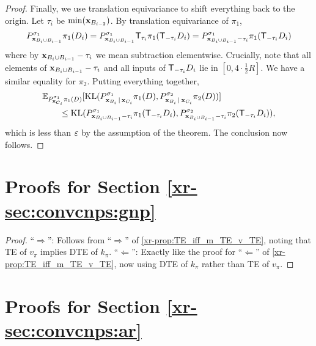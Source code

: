 \documentclass[12pt, twoside]{report}
\newcommand{\xrprefix}[1]{xr-#1}
\begin{document}
\begin{proof}
    Finally, we use translation equivariance to shift everything back to the origin.
    Let $\tau_i$ be $\operatorname*{min}(\mathbf{x}_{B_{i-2}})$.
    By translation equivariance of $\pi_1$,
    \begin{equation}
        P_{\vx_{B_i \cup B_{i-1}}}^{\sigma_1} \pi_1(D_i)
        = P_{\vx_{B_i \cup B_{i-1}}}^{\sigma_1} \T_{\tau_i} \pi_1(\T_{-\tau_i} D_i)
        = P_{\vx_{B_i \cup B_{i-1}} - \tau_i}^{\sigma_1} \pi_1(\T_{-\tau_i} D_i)
    \end{equation}
    where by $\mathbf{x}_{B_i \cup B_{i-1}} - \tau_i$ we mean subtraction elementwise.
    Crucially, note that all elements of $\mathbf{x}_{B_i \cup B_{i-1}} - \tau_i$ and all inputs of $\T_{-\tau_i} D_i$ lie in $[0, 4 \cdot \tfrac12 R]$.
    We have a similar equality for $\pi_2$.
    Putting everything together,
    \begin{align}
        &\E_{P^{\sigma_1}_{\vx_{C_i}}\pi_1(D)}[ \KL(
            P_{\vx_{B_i} \cond \vx_{C_i}}^{\sigma_1} \pi_1(D),
            P_{\vx_{B_i} \cond \vx_{C_i}}^{\sigma_2} \pi_2(D)
        )] \nonumber \\
        &\qquad\le \KL(
        P_{\vx_{B_i \cup B_{i-1}} - \tau_i}^{\sigma_1} \pi_1(\T_{-\tau_i}D_i),
        P_{\vx_{B_i \cup B_{i-1}} - \tau_i}^{\sigma_2} \pi_2(\T_{-\tau_i}D_i)
            ),
    \end{align}
    which is less than $\varepsilon$ by the assumption of the theorem.
    The conclusion now follows.
\end{proof}

\section{Proofs for Section \ref{\xrprefix{sec:convcnps:gnp}}}
\label{sec:proofs_convcnps:gnp}

\begin{proof}
    ``$\Rightarrow$'': Follows from ``$\Rightarrow$'' of \cref{\xrprefix{prop:TE_iff_m_TE_v_TE}}, noting that TE of $v_\pi$ implies DTE of $k_\pi$.
    ``$\Leftarrow$'': Exactly like the proof for ``$\Leftarrow$'' of \cref{\xrprefix{prop:TE_iff_m_TE_v_TE}}, now using DTE of $k_\pi$ rather than TE of $v_\pi$.
\end{proof}


\section{Proofs for Section \ref{\xrprefix{sec:convcnps:ar}}}
\label{sec:proofs_convcnps:ar}
\end{document}
